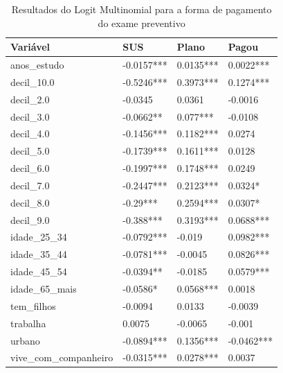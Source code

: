 \begin{table}
\caption{Resultados do Logit Multinomial para a forma de pagamento do exame preventivo}
\label{tab:logit_pagamento}
\begin{tabular}{llll}
\toprule
Variável & SUS & Plano & Pagou \\
\midrule
anos_estudo & -0.0157*** & 0.0135*** & 0.0022*** \\
decil_10.0 & -0.5246*** & 0.3973*** & 0.1274*** \\
decil_2.0 & -0.0345 & 0.0361 & -0.0016 \\
decil_3.0 & -0.0662** & 0.077*** & -0.0108 \\
decil_4.0 & -0.1456*** & 0.1182*** & 0.0274 \\
decil_5.0 & -0.1739*** & 0.1611*** & 0.0128 \\
decil_6.0 & -0.1997*** & 0.1748*** & 0.0249 \\
decil_7.0 & -0.2447*** & 0.2123*** & 0.0324* \\
decil_8.0 & -0.29*** & 0.2594*** & 0.0307* \\
decil_9.0 & -0.388*** & 0.3193*** & 0.0688*** \\
idade_25_34 & -0.0792*** & -0.019 & 0.0982*** \\
idade_35_44 & -0.0781*** & -0.0045 & 0.0826*** \\
idade_45_54 & -0.0394** & -0.0185 & 0.0579*** \\
idade_65_mais & -0.0586* & 0.0568*** & 0.0018 \\
tem_filhos & -0.0094 & 0.0133 & -0.0039 \\
trabalha & 0.0075 & -0.0065 & -0.001 \\
urbano & -0.0894*** & 0.1356*** & -0.0462*** \\
vive_com_companheiro & -0.0315*** & 0.0278*** & 0.0037 \\
\bottomrule
\end{tabular}
\end{table}
